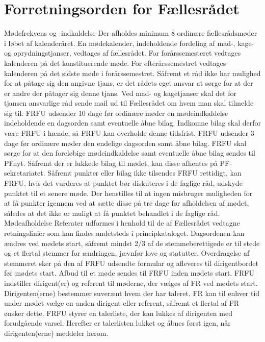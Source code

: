\section{Forretningsorden for Fællesrådet}

Mødefrekvens og -indkaldelse
Der afholdes minimum 8 ordinære fællesrådsmøder i løbet af kalenderåret. En mødekalender, indeholdende fordeling af
mad-, kage- og oprydningstjanser, vedtages af fællesrådet. For forårssemesteret vedtages kalenderen på det
konstituerende møde. For efterårssemestret vedtages kalenderen på det sidste møde i forårssemestret. Såfremt et råd
ikke har mulighed for at påtage sig den angivne tjans, er det rådets eget ansvar at sørge for at der er andre der påtager
sig denne tjans. Ved mad- og kagetjanser skal det for tjansen ansvarlige råd sende mail ud til Fællesrådet om hvem man
skal tilmelde sig til.
FRFU udsender 10 dage før ordinære møder en mødeindkaldelse indeholdende en dagsorden samt eventuelle åbne
bilag. Indkomne bilag skal derfor være FRFU i hænde, så FRFU kan overholde denne tidsfrist. FRFU udsender 3 dage
før ordinære møder den endelige dagsorden samt åbne bilag. FRFU skal sørge for at den foreløbige mødeindkaldelse
samt eventuelle åbne bilag sendes til PFnyt. Såfremt der er lukkede bilag til mødet, kan disse afhentes på PF-
sekretariatet.
Såfremt punkter eller bilag ikke tilsendes FRFU rettidigt, kan FRFU, hvis det vurderes at punktet bør diskuteres i de
faglige råd, udskyde punktet til et senere møde. Der henstilles til at ingen misbruger muligheden for at få punkter
igennem ved at sætte disse på tre dage før afholdelsen af mødet, således at det ikke er muligt at få punktet behandlet i de
faglige råd.
Mødeafholdelse
Referater udformes i henhold til de af Fællesrådet vedtagne retningslinier som kan findes andetsteds i principkataloget.
Dagsordenen kan ændres ved mødets start, såfremt mindst 2/3 af de stemmeberettigede er til stede og et flertal stemmer
for ændringen, jævnfør love og statutter.
Overdragelse af stemmeret sker på den af FRFU udsendte formular og afleveres til dirigentbordet før mødets start.
Afbud til et møde sendes til FRFU inden mødets start.
FRFU indstiller dirigent(er) og referent til møderne, der vælges af FR ved mødets start. Dirigenten(erne) bestemmer
suverænt hvem der har taleret. FR kan til enhver tid under mødet vælge en anden dirigent eller referent, såfremt et
flertal af FR ønsker dette. FRFU styrer en talerliste, der kan lukkes af dirigenten med forudgående varsel. Herefter er
talerlisten lukket og åbnes først igen, når dirigenten(erne) meddeler herom.
